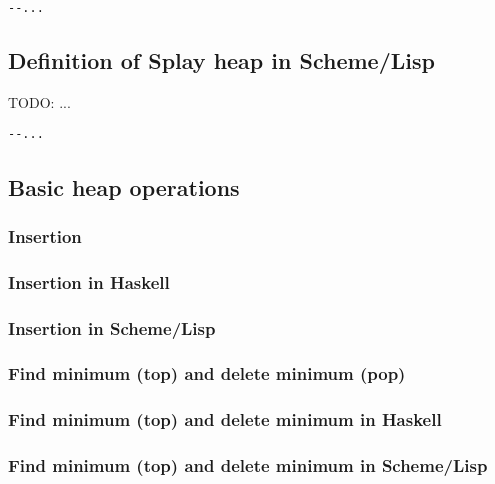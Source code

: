 \documentclass{article}
\begin{document}
\lstset{language=Haskell}
\begin{lstlisting}
--...
\end{lstlisting}

\subsection*{Definition of Splay heap in Scheme/Lisp}

TODO: ...

\lstset{language=lisp}
\begin{lstlisting}
--...
\end{lstlisting}

\subsection{Basic heap operations}

\subsubsection{Insertion}

\subsubsection*{Insertion in Haskell}

\subsubsection*{Insertion in Scheme/Lisp}

\subsubsection{Find minimum (top) and delete minimum (pop)}

\subsubsection*{Find minimum (top) and delete minimum in Haskell}

\subsubsection*{Find minimum (top) and delete minimum in Scheme/Lisp}

\end{document}
